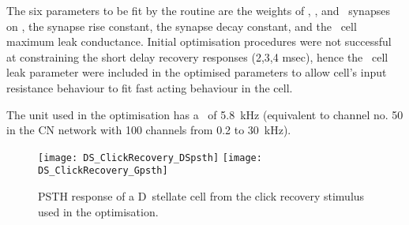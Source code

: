The six parameters to be fit by the routine are the weights of \GLG\@, \HSR\@, and
\LSR~synapses on \DS, the \GABAa synapse rise constant, the \GABAa synapse decay
constant, and the \DS~cell maximum leak conductance. Initial optimisation
procedures were not successful at constraining the short delay recovery
responses (2,3,4 msec), hence the \DS~cell leak
parameter were included in the optimised parameters to allow cell's input
resistance behaviour to fit fast acting behaviour in the cell.

The unit used in the optimisation has a \CF~of
5.8~kHz (equivalent to channel no. 50 in the CN network with 100 channels from
0.2 to 30~kHz).

\begin{figure}[htb]
  \centering
  \texttt{[image: DS\_ClickRecovery\_DSpsth]}%
  \texttt{[image: DS\_ClickRecovery\_Gpsth]}%
  \caption[PSTH response to click recovery stimulus]{PSTH response of a
    D~stellate cell from the click recovery stimulus used in the
    optimisation.  }\label{fig:ClickExamples}
\end{figure}











